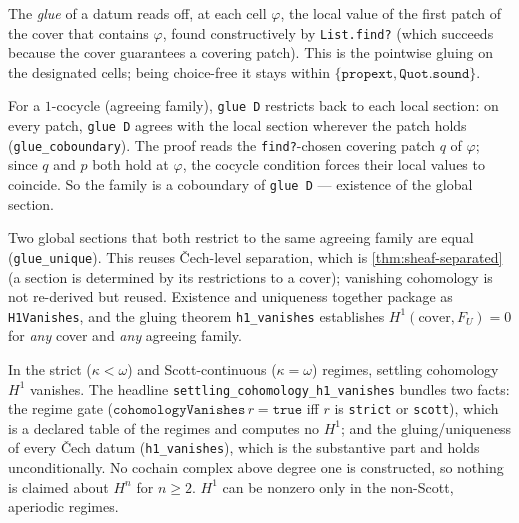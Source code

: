 \begin{proposition}\label{thm:glue}\leanok{}
The \emph{glue} of a datum reads off, at each cell $\varphi$, the local value of the first patch of the cover that contains $\varphi$, found constructively by \texttt{List.find?} (which succeeds because the cover guarantees a covering patch). This is the pointwise gluing on the designated cells; being choice-free it stays within $\{\texttt{propext}, \texttt{Quot.sound}\}$.
\end{proposition}
\begin{theorem}\label{thm:h1-vanishes}\leanok{}
For a $1$-cocycle (agreeing family), \texttt{glue D} restricts back to each local section: on every patch, \texttt{glue D} agrees with the local section wherever the patch holds (\texttt{glue\_coboundary}). The proof reads the \texttt{find?}-chosen covering patch $q$ of $\varphi$; since $q$ and $p$ both hold at $\varphi$, the cocycle condition forces their local values to coincide. So the family is a coboundary of \texttt{glue D} --- existence of the global section.
\end{theorem}
\begin{theorem}\label{thm:classifying-invariant-zero}\leanok{}
Two global sections that both restrict to the same agreeing family are equal (\texttt{glue\_unique}). This reuses \v{C}ech-level separation, which is \cref{thm:sheaf-separated} (a section is determined by its restrictions to a cover); vanishing cohomology is not re-derived but reused. Existence and uniqueness together package as \texttt{H1Vanishes}, and the gluing theorem \texttt{h1\_vanishes} establishes $H^1(\text{cover}, F_U) = 0$ for \emph{any} cover and \emph{any} agreeing family.
\end{theorem}
\begin{theorem}[$H^1$ vanishes]\label{thm:h1-zero-iff-confluent}\leanok{}
In the strict ($\kappa < \omega$) and Scott-continuous ($\kappa = \omega$) regimes, settling cohomology $H^1$ vanishes. The headline \texttt{settling\_cohomology\_h1\_vanishes} bundles two facts: the regime gate ($\texttt{cohomologyVanishes}\,r = \texttt{true}$ iff $r$ is \texttt{strict} or \texttt{scott}), which is a declared table of the regimes and computes no $H^1$; and the gluing/uniqueness of every \v{C}ech datum (\texttt{h1\_vanishes}), which is the substantive part and holds unconditionally. No cochain complex above degree one is constructed, so nothing is claimed about $H^n$ for $n \geq 2$. $H^1$ can be nonzero only in the non-Scott, aperiodic regimes.
\end{theorem}
